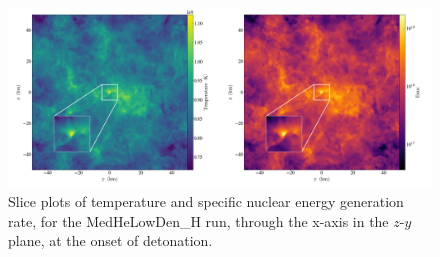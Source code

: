 \begin{center}
\begin{figure}[!htb]

\includegraphics[width=1.0\textwidth]{combined_512_10e5_0.25_new.png}
\centering
\caption[Slice plots of temperature and specific nuclear energy generation rate, for the MedHeLowDen\_H run]{Slice plots of temperature and specific nuclear energy generation rate, for the MedHeLowDen\_H run, through the x-axis in the $z$-$y$ plane, at the onset of detonation.}
\label {fig:temp_enuc}

\end{figure}
\end{center}

